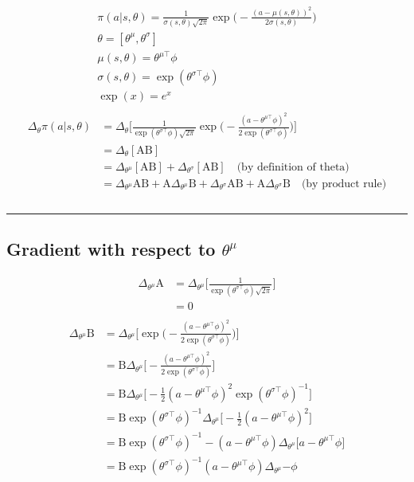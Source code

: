 \documentclass{article}
\begin{document}
\begin{gather*}
\pi (a | s, \theta) =  \frac{1}{\sigma(s, \theta)\sqrt{2\pi}}\exp\bigg(- \frac{(a - \mu(s, \theta))^2}{2\sigma(s, \theta)}\bigg)\\
\theta = [\theta^\mu, \theta^\sigma] \\
\mu(s, \theta) = \theta^{\mu\top}\phi\\
\sigma(s, \theta) = \exp(\theta^{\sigma\top}\phi)\\
\exp(x) = e^x\\
\end{gather*}
\begin{align*}
\Delta_\theta \pi (a | s, \theta) &= \Delta_\theta \bigg[ \frac{1}{\exp(\theta^
	{\sigma\top}\phi)\sqrt{2\pi}}\exp\bigg(- \frac{(a - \theta^{\mu\top}\phi)^2}{2\exp(\theta^{\sigma\top}\phi)}\bigg)\bigg]\\
&= \Delta_\theta[\text{AB}] \\
&= \Delta_{\theta^\mu}[\text{AB}] + \Delta_{\theta^\sigma}[\text{AB}]  \quad\text{(by definition of theta)}\\
&= \Delta_{\theta^\mu}\text{A}\text{B} + \text{A}\Delta_{\theta^\mu}\text{B} + \Delta_{\theta^\sigma}\text{A}\text{B} + \text{A}\Delta_{\theta^\sigma}\text{B}  \quad\text{(by product rule)}\\ \\
\end{align*}
\hrule
\subsection{Gradient with respect to $\theta^\mu$}
\begin{align*}
\Delta_{\theta^\mu} \text{A} &= \Delta_{\theta^\mu} \bigg[\frac{1}{\exp(\theta^
	{\sigma\top}\phi)\sqrt{2\pi}}\bigg]\\
&=  0\\
\end{align*}
\begin{align*}
\Delta_{\theta^\mu} \text{B} &= \Delta_{\theta^\mu} \bigg[ \exp\bigg(- \frac{(a - \theta^{\mu\top}\phi)^2}{2\exp(\theta^{\sigma\top}\phi)}\bigg)\bigg]\\
&= \text{B} \Delta_{\theta^\mu} \bigg[- \frac{(a - \theta^{\mu\top}\phi)^2}{2\exp(\theta^{\sigma\top}\phi)}\bigg]\\
&= \text{B} \Delta_{\theta^\mu} \bigg[-\frac{1}{2} (a - \theta^{\mu\top}\phi)^2\exp(\theta^{\sigma\top}\phi)^{-1}\bigg]\\
&= \text{B} \exp(\theta^{\sigma\top}\phi)^{-1} \Delta_{\theta^\mu} \bigg[-\frac{1}{2} (a - \theta^{\mu\top}\phi)^2\bigg]\\
&= \text{B} \exp(\theta^{\sigma\top}\phi)^{-1} -(a - \theta^{\mu\top}\phi)\Delta_{\theta^\mu} \bigg[a - \theta^{\mu\top}\phi\bigg]\\
&= \text{B} \exp(\theta^{\sigma\top}\phi)^{-1} (a - \theta^{\mu\top}\phi)\Delta_{\theta^\mu}  {-\phi}\\
\end{align*}
\end{document}

